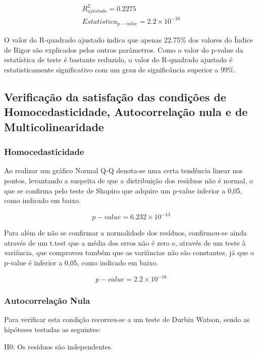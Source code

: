 \documentclass[conference]{IEEEtran}
\begin{document}
\begin{equation}
\begin{array}{l}
	R^{2}_{ajustado}=0.2275 \\
	Estatistica _{p-value}=2.2\times 10^{-16}
\end{array}
\end{equation}

O valor do R-quadrado ajustado indica que apenas 22.75\% dos valores do Índice de Rigor são explicados pelos outros parâmetros. Como o valor do p-value da estatística de teste é bastante reduzido, o valor do R-quadrado ajustado é estatisticamente significativo com um grau de significância superior a 99\%.

\subsection{Verificação da satisfação das condições de Homocedasticidade, Autocorrelação nula e de Multicolinearidade}

\subsubsection{Homocedasticidade} 
Ao realizar um gráfico Normal Q-Q denota-se uma certa tendência linear nos pontos, levantando a suspeita de que a distribuição dos resíduos não é normal, o que se confirma pelo teste de Shapiro que adquire um p-value inferior a 0,05, como indicado em baixo.

\begin{equation}
p-value = 6.232\times 10^{-13}\label{eq}
\end{equation}

Para além de não se confirmar a normalidade dos resíduos, confirmou-se ainda através de um t.test que a média dos erros não é zero e, através de um teste à variância, que comprovou também que as variâncias não são constantes, já que o p-value é inferior a 0,05, como indicado em baixo.

\begin{equation}
p-value = 2.2\times 10^{-16}\label{eq}
\end{equation}

\subsubsection{Autocorrelação Nula} 
Para verificar esta condição recorreu-se a um teste de Durbin Watson, sendo as hipóteses testadas as seguintes:

H0: Os resíduos são independentes.
\end{document}
